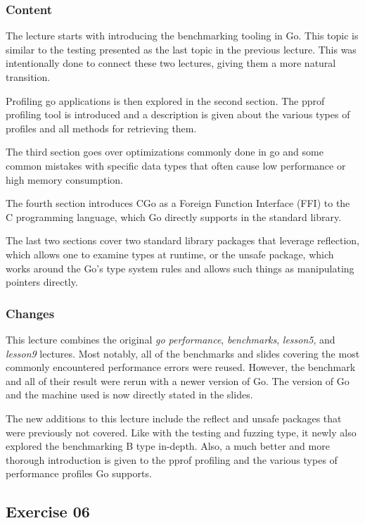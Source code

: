 \documentclass[
  digital,
  color,
  oneside,
  nosansbold,
  nocolorbold,
  nolof,
  nolot,
]{fithesis4}
\begin{document}
\subsubsection{Content}

The lecture starts with introducing the benchmarking tooling in Go. This topic is similar to the testing presented as the last topic in the previous lecture. This was intentionally done to connect these two lectures, giving them a more natural transition.

Profiling go applications is then explored in the second section. The pprof profiling tool is introduced and a description is given about the various types of profiles and all methods for retrieving them.

The third section goes over optimizations commonly done in go and some common mistakes with specific data types that often cause low performance or high memory consumption.

The fourth section introduces CGo as a Foreign Function Interface (FFI) to the C programming language, which Go directly supports in the standard library.

The last two sections cover two standard library packages that leverage reflection, which allows one to examine types at runtime, or the unsafe package, which works around the Go's type system rules and allows such things as manipulating pointers directly.

\subsubsection{Changes}

This lecture combines the original \textit{go performance}, \textit{benchmarks}, \textit{lesson5}, and \textit{lesson9} lectures. Most notably, all of the benchmarks and slides covering the most commonly encountered performance errors were reused. However, the benchmark and all of their result were rerun with a newer version of Go. The version of Go and the machine used is now directly stated in the slides.

The new additions to this lecture include the reflect and unsafe packages that were previously not covered. Like with the testing and fuzzing type, it newly also explored the benchmarking B type in-depth. Also, a much better and more thorough introduction is given to the pprof profiling and the various types of performance profiles Go supports.

\subsection{Exercise 06}
\end{document}
